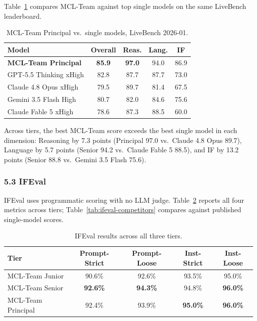 \documentclass[
]{article}
\begin{document}
Table~\ref{tab:comparison} compares MCL-Team against top single models on the same LiveBench leaderboard.

\begin{table}[H]
\centering
\caption{MCL-Team Principal vs.\ single models, LiveBench 2026-01.}
\label{tab:comparison}
\begin{tabular}{@{}lcccc@{}}
\toprule
\textbf{Model} & \textbf{Overall} & \textbf{Reas.} & \textbf{Lang.} & \textbf{IF} \\
\midrule
\textbf{MCL-Team Principal} & \textbf{85.9} & \textbf{97.0} & 94.0 & 86.9 \\
GPT-5.5 Thinking xHigh & 82.8 & 87.7 & 87.7 & 73.0 \\
Claude 4.8 Opus xHigh & 79.5 & 89.7 & 81.4 & 67.5 \\
Gemini 3.5 Flash High & 80.7 & 82.0 & 84.6 & 75.6 \\
Claude Fable 5 xHigh & 78.6 & 87.3 & 88.5 & 60.0 \\
\bottomrule
\end{tabular}
\end{table}

Across tiers, the best MCL-Team score exceeds the best single model in each dimension: Reasoning by 7.3 points (Principal 97.0 vs.\ Claude 4.8 Opus 89.7), Language by 5.7 points (Senior 94.2 vs.\ Claude Fable 5 88.5), and IF by 13.2 points (Senior 88.8 vs.\ Gemini 3.5 Flash 75.6).

\subsubsection{5.3 IFEval}\label{ifeval-results}

IFEval uses programmatic scoring with no LLM judge. Table~\ref{tab:ifeval} reports all four metrics across tiers; Table~\ref{tab:ifeval-competitors} compares against published single-model scores.

\begin{table}[H]
\centering
\caption{IFEval results across all three tiers.}
\label{tab:ifeval}
\begin{tabular}{@{}lcccc@{}}
\toprule
\textbf{Tier} & \textbf{Prompt-Strict} & \textbf{Prompt-Loose} & \textbf{Inst-Strict} & \textbf{Inst-Loose} \\
\midrule
MCL-Team Junior    & 90.6\% & 92.6\% & 93.5\% & 95.0\% \\
MCL-Team Senior    & \textbf{92.6\%} & \textbf{94.3\%} & 94.8\% & \textbf{96.0\%} \\
MCL-Team Principal & 92.4\% & 93.9\% & \textbf{95.0\%} & \textbf{96.0\%} \\
\bottomrule
\end{tabular}
\end{table}
\end{document}
